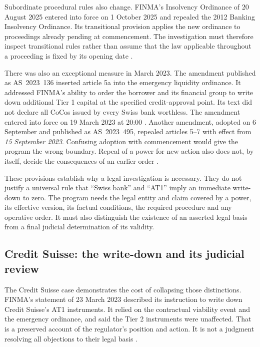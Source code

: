 \documentclass[12pt,a4paper,oneside,openany]{book}
\begin{document}
Subordinate procedural rules also change. FINMA's Insolvency Ordinance of
20 August 2025 entered into force on 1 October 2025 and repealed the 2012
Banking Insolvency Ordinance. Its transitional provision applies the new
ordinance to proceedings already pending at commencement. The investigation
must therefore inspect transitional rules rather than assume that the law
applicable throughout a proceeding is fixed by its opening date
\citep[arts.~1--2 and 48--50]{swissinsolvency2025}.

There was also an exceptional measure in March 2023. The amendment published
as AS~2023~136 inserted article 5a into the emergency liquidity ordinance.
It addressed FINMA's ability to order the borrower and its financial group to
write down additional Tier 1 capital at the specified credit-approval point.
Its text did not declare all CoCos issued by every Swiss bank worthless.
The amendment entered into force on 19 March 2023 at 20:00
\citep[art.~5a and commencement provision]{swissemergency2023}. Another amendment,
adopted on 6 September and published as AS~2023~495, repealed articles 5--7
with effect from \emph{15 September 2023}. Confusing adoption with commencement
would give the program the wrong boundary. Repeal of a power for new action
also does not, by itself, decide the consequences of an earlier order
\citep[repeals and commencement provision]{swissrepeal2023}.

These provisions establish why a legal investigation is necessary. They do not
justify a universal rule that ``Swiss bank'' and ``AT1'' imply an immediate
write-down to zero. The program needs the legal entity and claim covered by a
power, its effective version, its factual conditions, the required procedure
and any operative order. It must also distinguish the existence of an asserted
legal basis from a final judicial determination of its validity.

\subsection{Credit Suisse: the write-down and its judicial review}

The Credit Suisse case demonstrates the cost of collapsing those distinctions.
FINMA's statement of 23 March 2023 described its instruction to write down
Credit Suisse's AT1 instruments. It relied on the contractual viability event
and the emergency ordinance, and said the Tier 2 instruments were unaffected.
That is a preserved account of the regulator's position and action. It is not
a judgment resolving all objections to their legal basis
\citep{finmaat12023}.
\end{document}
